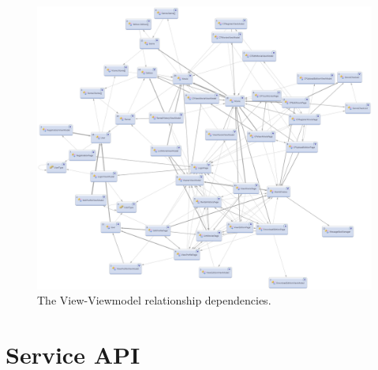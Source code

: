 \begin{figure}[!ht]
  \centering
    \includegraphics[width=\textwidth]{Parts/Appendix/Images/Implementation/ViewViewModel}
  \caption{The View-Viewmodel relationship dependencies.}
  \label{fig:Appendix_Diagrams_Class_Client_ViewViewModel}
\end{figure}

\section{Service API}
\label{Appendix_Diagrams_ServiceAPI}